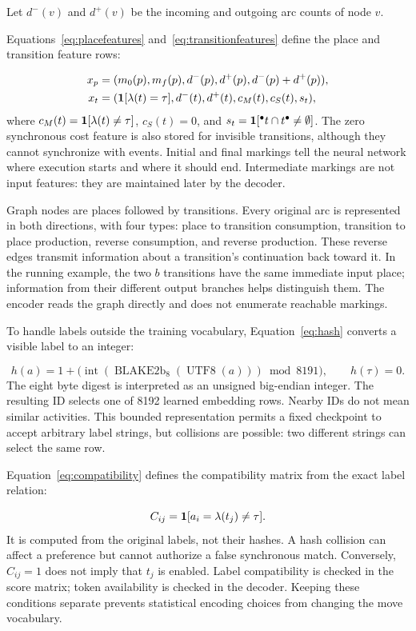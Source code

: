 Let $d^-(v)$ and $d^+(v)$ be the incoming and outgoing arc counts of node $v$. \begin{revised}Equations~\eqref{eq:placefeatures} and~\eqref{eq:transitionfeatures} define the place and transition feature rows:\end{revised}
\begin{align}
 x_p&=(m_0(p),m_f(p),d^-(p),d^+(p),d^-(p)+d^+(p)),\label{eq:placefeatures}\\
 x_t&=(\mathbf{1}[\lambda(t)=\tau],d^-(t),d^+(t),c_M(t),c_S(t),s_t),\label{eq:transitionfeatures}
\end{align}
where $c_M(t)=\mathbf{1}[\lambda(t)\ne\tau]$, $c_S(t)=0$, and $s_t=\mathbf{1}[{}^\bullet t\cap t^\bullet\ne\emptyset]$. The zero synchronous cost feature is also stored for invisible transitions, although they cannot synchronize with events. Initial and final markings tell the neural network where execution starts and where it should end. Intermediate markings are not input features: they are maintained later by the decoder.

Graph nodes are places followed by transitions. Every original arc is represented in both directions, with four types: place to transition consumption, transition to place production, reverse consumption, and reverse production. These reverse edges transmit information about a transition's continuation back toward it. In the running example, the two $b$ transitions have the same immediate input place; information from their different output branches helps distinguish them. The encoder reads the graph directly and does not enumerate reachable markings.

\begin{revised}To handle labels outside the training vocabulary, Equation~\eqref{eq:hash} converts a visible label to an integer:\end{revised}
\begin{equation}
 h(a)=1+\bigl(\operatorname{int}(\operatorname{BLAKE2b}_8(\operatorname{UTF8}(a)))\bmod8191\bigr),
 \qquad h(\tau)=0.
 \label{eq:hash}
\end{equation}
The eight byte digest is interpreted as an unsigned big-endian integer. The resulting ID selects one of 8192 learned embedding rows. Nearby IDs do not mean similar activities. This bounded representation permits a fixed checkpoint to accept arbitrary label strings, but collisions are possible: two different strings can select the same row.

\begin{revised}Equation~\eqref{eq:compatibility} defines the compatibility matrix from the exact label relation:\end{revised}
\begin{equation}
 C_{ij}=\mathbf{1}[a_i=\lambda(t_j)\ne\tau].
 \label{eq:compatibility}
\end{equation}
It is computed from the original labels, not their hashes. A hash collision can affect a preference but cannot authorize a false synchronous match. Conversely, $C_{ij}=1$ does not imply that $t_j$ is enabled. Label compatibility is checked in the score matrix; token availability is checked in the decoder. Keeping these conditions separate prevents statistical encoding choices from changing the move vocabulary.

